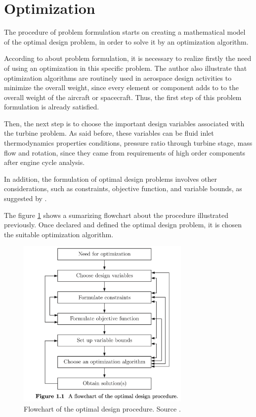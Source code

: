 \section{Optimization}
The procedure of problem formulation starts on creating a mathematical model of the optimal design problem, in order to solve it by an optimization algorithm.

According to \cite{Deb2012} about problem formulation, it is necessary to realize firstly the need of using an optimization in this specific problem. The author also illustrate that optimization algorithms are routinely used in aerospace design activities to minimize the overall weight, since every element or component adds to to the overall weight of the aircraft or spacecraft. Thus, the first step of this problem formulation is already satisfied.

Then, the next step is to choose the important design variables associated with the turbine problem. As said before, these variables can be fluid inlet thermodynamics properties conditions, pressure ratio through turbine stage, mass flow and rotation, since they came from requirements of high order components after engine cycle analysis.

In addition, the formulation of optimal design problems involves other considerations, such as constraints, objective function, and variable bounds, as suggested by \cite{Deb2012}.

The figure \ref{fig:od_flowchart} shows a sumarizing flowchart about the procedure illustrated previously. Once declared and defined the optimal design problem, it is chosen the suitable optimization algorithm.

\begin{figure}[h]
    \centering
    \includegraphics[width=0.75\textwidth]{Cap3/od_flowchart.png}
    \caption{Flowchart of the optimal design procedure. Source \cite{Deb2012}.}
    \label{fig:od_flowchart}
\end{figure}

